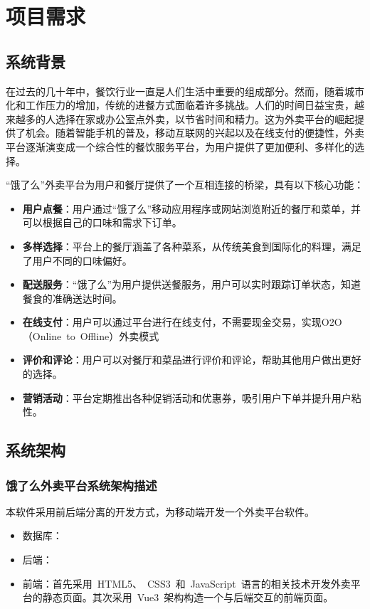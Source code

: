 \chapter{项目需求}

\section{系统背景}
在过去的几十年中，餐饮行业一直是人们生活中重要的组成部分。然而，随着城市化和工作压力的增加，传统的进餐方式面临着许多挑战。人们的时间日益宝贵，越来越多的人选择在家或办公室点外卖，以节省时间和精力。这为外卖平台的崛起提供了机会。随着智能手机的普及，移动互联网的兴起以及在线支付的便捷性，外卖平台逐渐演变成一个综合性的餐饮服务平台，为用户提供了更加便利、多样化的选择。

“饿了么”外卖平台为用户和餐厅提供了一个互相连接的桥梁，具有以下核心功能：
\begin{itemize}
    \item{\textbf{用户点餐}}：用户通过“饿了么”移动应用程序或网站浏览附近的餐厅和菜单，并可以根据自己的口味和需求下订单。
    \item{\textbf{多样选择}}：平台上的餐厅涵盖了各种菜系，从传统美食到国际化的料理，满足了用户不同的口味偏好。
    \item{\textbf{配送服务}}：“饿了么”为用户提供送餐服务，用户可以实时跟踪订单状态，知道餐食的准确送达时间。
    \item{\textbf{在线支付}}：用户可以通过平台进行在线支付，不需要现金交易，实现O2O（Online~to~Offline）外卖模式
    \item{\textbf{评价和评论}}：用户可以对餐厅和菜品进行评价和评论，帮助其他用户做出更好的选择。
    \item{\textbf{营销活动}}：平台定期推出各种促销活动和优惠券，吸引用户下单并提升用户粘性。
\end{itemize}

\section{系统架构}
\subsection{饿了么外卖平台系统架构描述}
本软件采用前后端分离的开发方式，为移动端开发一个外卖平台软件。
\begin{itemize}
    \item {数据库}：
    \item {后端}：
    \item {前端}：首先采用~HTML5、~CSS3~和~JavaScript~语言的相关技术开发外卖平台的静态页面。其次采用~Vue3~架构构造一个与后端交互的前端页面。
\end{itemize}
